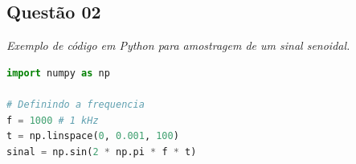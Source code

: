 \subsection*{Questão 02}

\textit{Exemplo de código em Python para amostragem de um sinal senoidal.}

\begin{lstlisting}[language=Python, caption={Exemplo de amostragem de sinal}]
import numpy as np

# Definindo a frequencia
f = 1000 # 1 kHz
t = np.linspace(0, 0.001, 100)
sinal = np.sin(2 * np.pi * f * t)
\end{lstlisting}